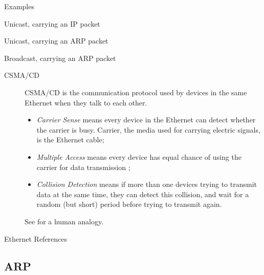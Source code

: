 \begin{frame}{Examples}
  \begin{iblock}{Unicast, carrying an IP packet}
    \mode<beamer>{\texttt{[image: ethframe3]}}%
  \end{iblock}
  \begin{iblock}{Unicast, carrying an ARP packet}
    \mode<beamer>{\texttt{[image: ethframe2]}}%
  \end{iblock}
  \begin{iblock}{Broadcast, carrying an ARP packet}
    \mode<beamer>{\texttt{[image: ethframe]}}%
  \end{iblock}
\end{frame}

\begin{description}
\item[CSMA/CD] CSMA/CD is the communication protocol used by devices in the same Ethernet
  when they talk to each other.
  \begin{itemize}
  \item \emph{Carrier Sense} means every device in the Ethernet can detect whether the
    carrier is busy. Carrier, the media used for carrying electric signals, is the Ethernet cable;
  \item \emph{Multiple Access} means every device has equal chance of using the carrier
    for data transmission ;
  \item \emph{Collision Detection} means if more than one devices trying to transmit
    data at the same time, they can detect this collision, and wait for a random (but
    short) period before trying to transmit again.
  \end{itemize}
  See  for a human analogy.
\end{description}

\begin{frame}{Ethernet References}
  \begin{refsection}
  \nocite{wiki:ethernet,wiki:ethframe,wiki:csmacd,rfc1042} \printbibliography[heading=none]
\end{refsection}
\end{frame}

\subsection{ARP}


